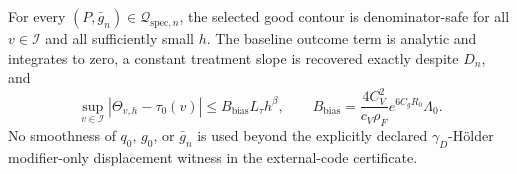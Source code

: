 For every \((P,\bar g_n)\in\mathcal Q_{\mathrm{spec},n}\), the selected good contour is denominator-safe for all \(v\in\mathcal I\) and all sufficiently small \(h\).  The baseline outcome term is analytic and integrates to zero, a constant treatment slope is recovered exactly despite \(D_n\), and
\[
 \sup_{v\in\mathcal I}|\Theta_{v,h}-\tau_0(v)|
 \le B_{\mathrm{bias}}L_\tau h^\beta,
 \qquad
 B_{\mathrm{bias}}=\frac{4C_V^2}{c_V\rho_F}
 e^{6C_gR_0}\Lambda_0.
\]
No smoothness of \(q_0\), \(g_0\), or \(\bar g_n\) is used beyond the explicitly declared \(\gamma_D\)-H\"older modifier-only displacement witness in the external-code certificate.